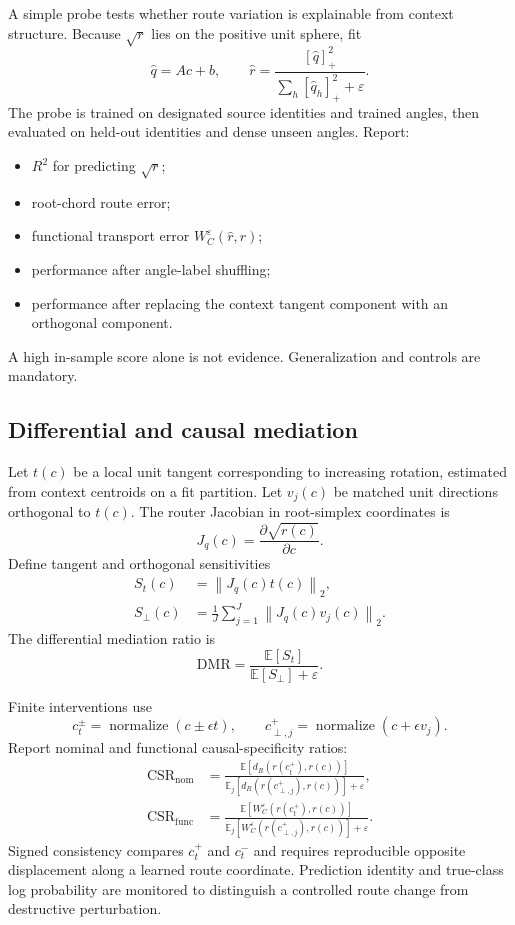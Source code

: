 \documentclass[11pt,a4paper]{article}
\newcommand{\E}{\mathbb{E}}
\newcommand{\norm}[1]{\left\lVert #1 \right\rVert}
\begin{document}
A simple probe tests whether route variation is explainable from context structure. Because $\sqrt r$ lies on the positive unit sphere, fit
\begin{equation}
 \widehat q=A c+b,
 \qquad
 \widehat r=\frac{[\widehat q]_+^2}{\sum_h[\widehat q_h]_+^2+\varepsilon}.
\end{equation}
The probe is trained on designated source identities and trained angles, then evaluated on held-out identities and dense unseen angles. Report:
\begin{itemize}
\item $R^2$ for predicting $\sqrt r$;
\item root-chord route error;
\item functional transport error $W_C^\varepsilon(\widehat r,r)$;
\item performance after angle-label shuffling;
\item performance after replacing the context tangent component with an orthogonal component.
\end{itemize}
A high in-sample score alone is not evidence. Generalization and controls are mandatory.

\subsection{Differential and causal mediation}

Let $t(c)$ be a local unit tangent corresponding to increasing rotation, estimated from context centroids on a fit partition. Let $v_j(c)$ be matched unit directions orthogonal to $t(c)$. The router Jacobian in root-simplex coordinates is
\begin{equation}
 J_q(c)=\frac{\partial\sqrt{r(c)}}{\partial c}.
\end{equation}
Define tangent and orthogonal sensitivities
\begin{align}
 S_t(c)&=\norm{J_q(c)t(c)}_2,\\
 S_\perp(c)&=\frac1J\sum_{j=1}^{J}\norm{J_q(c)v_j(c)}_2.
\end{align}
The differential mediation ratio is
\begin{equation}
 \mathrm{DMR}=\frac{\E[S_t]}{\E[S_\perp]+\varepsilon}.
\end{equation}

Finite interventions use
\begin{equation}
 c_t^\pm=\operatorname{normalize}(c\pm\epsilon t),
 \qquad
 c_{\perp,j}^+=\operatorname{normalize}(c+\epsilon v_j).
\end{equation}
Report nominal and functional causal-specificity ratios:
\begin{align}
 \mathrm{CSR}_{\mathrm{nom}}
 &=\frac{\E[d_R(r(c_t^+),r(c))]}
 {\E_j[d_R(r(c_{\perp,j}^+),r(c))]+\varepsilon},\\
 \mathrm{CSR}_{\mathrm{func}}
 &=\frac{\E[W_C^\varepsilon(r(c_t^+),r(c))]}
 {\E_j[W_C^\varepsilon(r(c_{\perp,j}^+),r(c))]+\varepsilon}.
\end{align}
Signed consistency compares $c_t^+$ and $c_t^-$ and requires reproducible opposite displacement along a learned route coordinate. Prediction identity and true-class log probability are monitored to distinguish a controlled route change from destructive perturbation.
\end{document}
